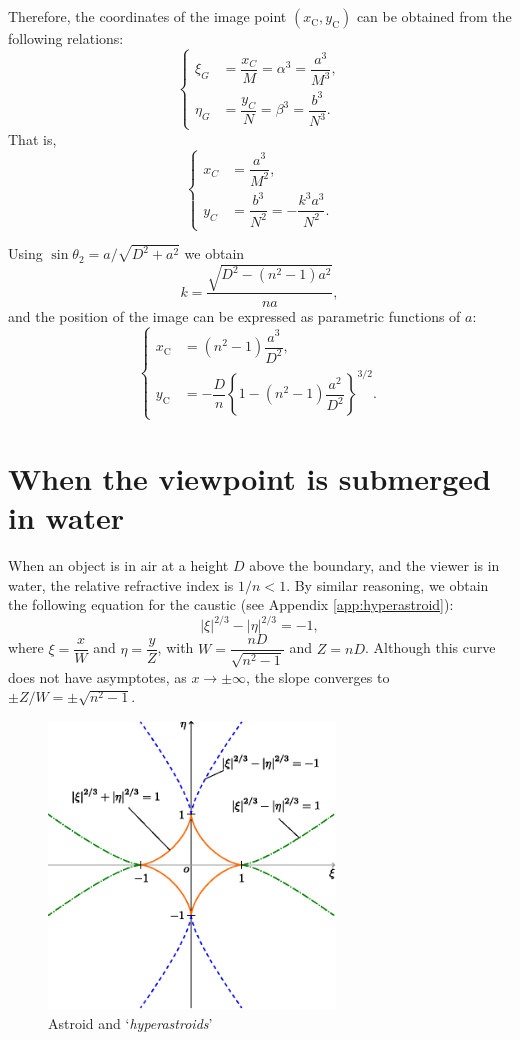 \documentclass[twocolumn]{article}
\begin{document}
Therefore, the coordinates of the image point $(x_{\mathrm{C}}^{}, y_{\mathrm{C}}^{})$ can be obtained from the following relations:
$$
\left\{
\begin{aligned}
	\xi_G &= \dfrac{x_C}{M} = \alpha^3 = \dfrac{a^3}{M^3},\\
	\eta_G &= \dfrac{y_C}{N} = \beta^3 = \dfrac{b^3}{N^3}.
\end{aligned}
\right.
$$
That is,
$$
\left\{
\begin{aligned}
	x_C &= \dfrac{a^3}{M^2},\\
	y_C &= \dfrac{b^3}{N^2}=-\dfrac{k^3a^3}{N^2}.
\end{aligned}
\right.
$$

Using 
$\sin\theta_2 = {a}/{\sqrt{D^2+a^2}}$
we obtain
$$k = \dfrac{\sqrt{D^2-(n^2-1)a^2}}{na},$$
and the position of the image can be expressed as parametric functions of $a$:
$$ \left\{ 
\begin{aligned}
	x_{\mathrm{C}}^{} &= (n^2-1)\dfrac{a^3}{D^2},\\
	y_{\mathrm{C}}^{} 
	&=-\dfrac{D}{n}\left\{ 1-(n^2-1)\dfrac{a^2}{D^2} \right\}^{3/2}.
\end{aligned}
\right.$$

\section{When the viewpoint is submerged in water}

When an object is in air at a height $D$ above the boundary, and the viewer is in water, the relative refractive index is $1/n < 1$. By similar reasoning, we obtain the following equation for the caustic (see Appendix \ref{app:hyperastroid}):
$$ \left| \xi \right|^{2/3} - \left| \eta \right|^{2/3} = -1, $$
where $\xi = \dfrac{x}{W} $ and $\eta = \dfrac{y}{Z}$, with $W = \dfrac{nD}{\sqrt{n^2-1}}$ and $Z = nD$. 
Although this curve does not have asymptotes, as $x \to \pm\infty$, the slope converges to $\pm Z/W = \pm \sqrt{n^2-1}$.

\begin{figure}
	\centering
	\includegraphics[width=3in]{figs/g254.eps}
	\caption{Astroid and `\emph{hyperastroids}'}
	\label{fig:hyperastroid}
\end{figure}
\end{document}
